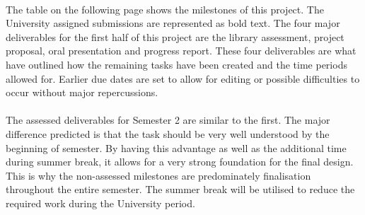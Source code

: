 \paragraph{}
The table on the following page shows the milestones of this project. The University assigned submissions are represented as bold text. The four major deliverables for the first half of this project are the library assessment, project proposal, oral presentation and progress report. These four deliverables are what have outlined how the remaining tasks have been created and the time periods allowed for. Earlier due dates are set to allow for editing or possible difficulties to occur without major repercussions. 

\paragraph{}
The assessed deliverables for Semester 2 are similar to the first. The major difference predicted is that the task should be very well understood by the beginning of semester. By having this advantage as well as the additional time during summer break, it allows for a very strong foundation for the final design. This is why the non-assessed milestones are predominately finalisation throughout the entire semester. The summer break will be utilised to reduce the required work during the University period. 

